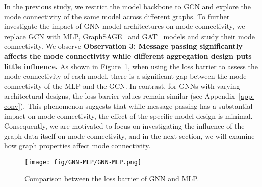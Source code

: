 
In the previous study, we restrict the model backbone to GCN and explore the mode connectivity of the same model across different graphs. To further investigate the impact of GNN model architectures on mode connectivity, we replace GCN with MLP, GraphSAGE~\citep{hamilton2017inductive} and GAT~\citep{velickovic2017graph} models and study their mode connectivity. We observe
\noindent\textbf{Observation 3: Message passing significantly affects the mode connectivity while different aggregation design puts little influence.} 
As shown in Figure~\ref{fig:obs3}, when using the loss barrier to assess the mode connectivity of each model, there is a significant gap between the mode connectivity of the MLP and the GCN. In contrast, for GNNs with varying architectural designs, the loss barrier values remain similar (see Appendix~\ref{app: conv}). This phenomenon suggests that while message passing has a substantial impact on mode connectivity, the effect of the specific model design is minimal. Consequently, we are motivated to focus on investigating the influence of the graph data itself on mode connectivity, and in the next section, we will examine how graph properties affect mode connectivity.
\begin{figure}
    \centering
    \texttt{[image: fig/GNN-MLP/GNN-MLP.png]}
    \vspace{-0.1in}
    \caption{Comparison between the loss barrier of GNN and MLP.}
    \label{fig:obs3}
    \vspace{-0.2in}
\end{figure}






